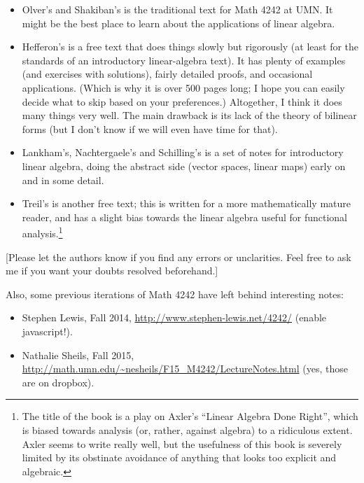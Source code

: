 \documentclass[numbers=enddot,12pt,final,onecolumn,notitlepage]{scrartcl}%
\newcounter{exer}
\theoremstyle{definition}
\begin{document}
\begin{itemize}
\item Olver's and Shakiban's \cite{OlvSha06} is the traditional text for Math
4242 at UMN. It might be the best place to learn about the applications of
linear algebra.

\item Hefferon's \cite{Heffer16} is a free text that does things slowly but
rigorously (at least for the standards of an introductory linear-algebra
text). It has plenty of examples (and exercises with solutions), fairly
detailed proofs, and occasional applications. (Which is why it is over 500
pages long; I hope you can easily decide what to skip based on your
preferences.) Altogether, I think it does many things very well. The main
drawback is its lack of the theory of bilinear forms (but I don't know if we
will even have time for that).

\item Lankham's, Nachtergaele's and Schilling's \cite{LaNaSc16} is a set of
notes for introductory linear algebra, doing the abstract side (vector spaces,
linear maps) early on and in some detail.

\item Treil's \cite{Treil15} is another free text; this is written for a more
mathematically mature reader, and has a slight bias towards the linear algebra
useful for functional analysis.\footnote{The title of the book is a play on
Axler's \textquotedblleft Linear Algebra Done Right\textquotedblright, which
is biased towards analysis (or, rather, against algebra) to a ridiculous
extent. Axler seems to write really well, but the usefulness of this book is
severely limited by its obstinate avoidance of anything that looks too
explicit and algebraic.}
\end{itemize}

{\small [Please let the authors know if you find any errors or unclarities.
Feel free to ask me if you want your doubts resolved beforehand.]}

Also, some previous iterations of Math 4242 have left behind interesting notes:

\begin{itemize}
\item Stephen Lewis, Fall 2014, \url{http://www.stephen-lewis.net/4242/}
(enable javascript!).

\item Nathalie Sheils, Fall 2015,
\url{http://math.umn.edu/~nesheils/F15_M4242/LectureNotes.html} (yes, those
are on dropbox).
\end{itemize}
\end{document}
